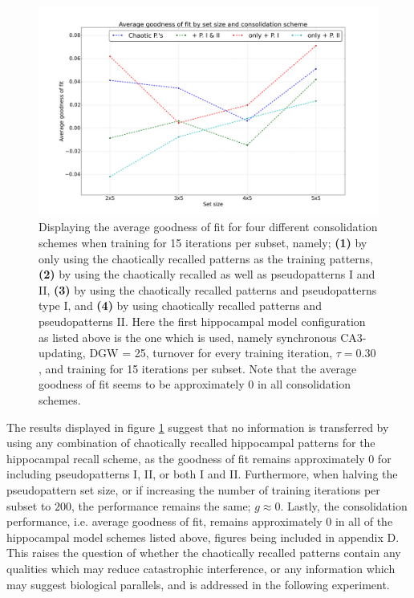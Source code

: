 \begin{figure}
    \centering
    \includegraphics[width=14cm]{fig/neo-consolidation/consolidation-schemes-sync-tm1-tr30_15_iters}
    \caption{Displaying the average goodness of fit for four different consolidation schemes when training for 15 iterations per subset, namely; \textbf{(1)} by only using the chaotically recalled patterns as the training patterns, \textbf{(2)} by using the chaotically recalled as well as pseudopatterns I and II, \textbf{(3)} by using the chaotically recalled patterns and pseudopatterns type I, and \textbf{(4)} by using chaotically recalled patterns and pseudopatterns II. Here the first hippocampal model configuration as listed above is the one which is used, namely synchronous CA3-updating, DGW = 25, turnover for every training iteration, $\tau=0.30$, and training for 15 iterations per subset. Note that the average goodness of fit seems to be approximately 0 in all consolidation schemes.}
    \label{fig:consolidation-schemes-sync}
\end{figure}

The results displayed in figure \ref{fig:consolidation-schemes-sync} suggest that no information is transferred by using any combination of chaotically recalled hippocampal patterns for the hippocampal recall scheme, as the goodness of fit remains approximately 0 for including pseudopatterns I, II, or both I and II. Furthermore, when halving the pseudopattern set size, or if increasing the number of training iterations per subset to $200$, the performance remains the same; $g\approx 0$. Lastly, the consolidation performance, i.e. average goodness of fit, remains approximately $0$ in all of the hippocampal model schemes listed above, figures being included in appendix D. 
This raises the question of whether the chaotically recalled patterns contain any qualities which may reduce catastrophic interference, or any information which may suggest biological parallels, and is addressed in the following experiment.

